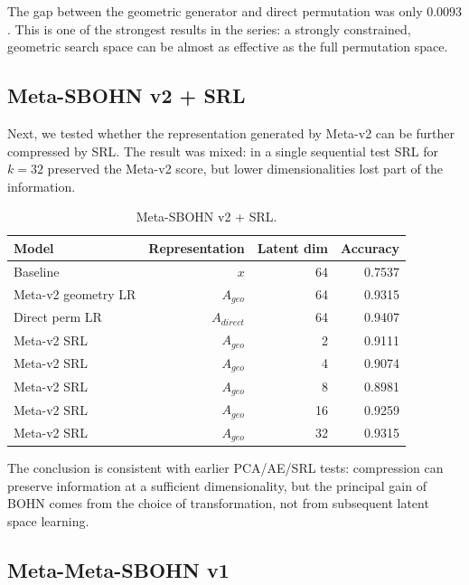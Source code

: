 \documentclass[11pt,a4paper]{report}
\begin{document}
The gap between the geometric generator and direct permutation was only
\(0.0093\). This is one of the strongest results in the series: a strongly constrained,
geometric search space can be almost as effective as the full permutation space.

\subsection{Meta-SBOHN v2 + SRL}

Next, we tested whether the representation generated by Meta-v2 can be further
compressed by SRL. The result was mixed: in a single sequential test SRL for
\(k=32\) preserved the Meta-v2 score, but lower dimensionalities lost part of the information.

\begin{table}[h]
\centering
\caption{Meta-SBOHN v2 + SRL.}
\begin{tabular}{l r r r}
\hline
Model & Representation & Latent dim & Accuracy \\
\hline
Baseline & \(x\) & 64 & 0.7537 \\
Meta-v2 geometry LR & \(A_{geo}\) & 64 & 0.9315 \\
Direct perm LR & \(A_{direct}\) & 64 & 0.9407 \\
Meta-v2 SRL & \(A_{geo}\) & 2 & 0.9111 \\
Meta-v2 SRL & \(A_{geo}\) & 4 & 0.9074 \\
Meta-v2 SRL & \(A_{geo}\) & 8 & 0.8981 \\
Meta-v2 SRL & \(A_{geo}\) & 16 & 0.9259 \\
Meta-v2 SRL & \(A_{geo}\) & 32 & 0.9315 \\
\hline
\end{tabular}
\end{table}

The conclusion is consistent with earlier PCA/AE/SRL tests: compression can preserve
information at a sufficient dimensionality, but the principal gain of BOHN comes from
the choice of transformation, not from subsequent latent space learning.

\subsection{Meta-Meta-SBOHN v1}
\end{document}
